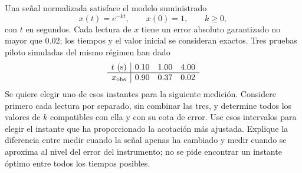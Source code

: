 Una señal normalizada satisface el modelo suministrado
\[
x(t)=e^{-kt},\qquad x(0)=1,\qquad k\ge0,
\]
con \(t\) en segundos. Cada lectura de \(x\) tiene un error absoluto garantizado no mayor que \(0.02\); los tiempos y el valor inicial se consideran exactos. Tres pruebas piloto simuladas del mismo régimen han dado
\[
\begin{array}{c|ccc}
t\ (\mathrm s)&0.10&1.00&4.00\\\hline
x_{\rm obs}&0.90&0.37&0.02
\end{array}
\]
Se quiere elegir uno de esos instantes para la siguiente medición. Considere primero cada lectura por separado, sin combinar las tres, y determine todos los valores de \(k\) compatibles con ella y con su cota de error. Use esos intervalos para elegir el instante que ha proporcionado la acotación más ajustada. Explique la diferencia entre medir cuando la señal apenas ha cambiado y medir cuando se aproxima al nivel del error del instrumento; no se pide encontrar un instante óptimo entre todos los tiempos posibles.
